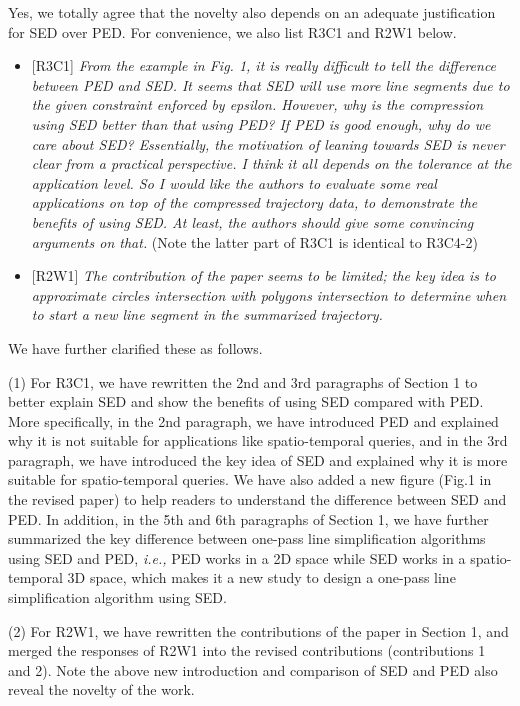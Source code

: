 \documentclass{letter}
\newcommand{\ie}{\emph{i.e.,}\xspace}
\begin{document}
Yes, we totally agree that the novelty also depends on an adequate justification for SED over PED.  For convenience, we also list R3C1 and R2W1 below.

\begin{itemize}
  \item {{[R3C1]} \emph{From the example in Fig. 1, it is really difficult to tell the difference between PED and SED. It seems that SED will use more line segments due to the given constraint enforced by epsilon. However, why is the compression using SED better than that using PED? If PED is good enough, why do we care about SED? Essentially, the motivation of leaning towards SED is never clear from a practical perspective. I think it all depends on the tolerance at the application level. So I would like the authors to evaluate some real applications on top of the compressed trajectory data, to demonstrate the benefits of using SED. At least, the authors should give some convincing arguments on that.} (Note the latter part of R3C1 is identical to R3C4-2)}
  \item {{[R2W1]} \emph{The contribution of the paper seems to be limited; the key idea is to approximate circles intersection with polygons intersection to determine when to start a new line segment in the summarized trajectory.}}
\end{itemize}

We have further clarified these as follows.

(1) For R3C1, we have rewritten the 2nd and 3rd paragraphs of Section 1 to better explain SED and show the benefits of using SED compared with PED.
More specifically, in the 2nd paragraph, we have introduced PED and explained why it is not suitable for applications like spatio-temporal queries, and in the 3rd paragraph, we have introduced the key idea of SED and explained why it is more suitable for spatio-temporal queries.
We have also added a new figure (Fig.1 in the revised paper) to help readers to understand the difference between SED and PED. In addition, in the 5th and 6th paragraphs of Section 1, we have further summarized the key difference between one-pass line simplification algorithms using SED and PED, \ie PED works in a 2D space while SED works in a spatio-temporal 3D space, which makes it a new study to design a one-pass line simplification algorithm using SED.

(2) For R2W1, we have rewritten the contributions of the paper in Section 1, and merged the responses of {R2W1} into the revised contributions (contributions 1 and 2). Note the above new introduction and comparison of SED and PED also reveal the novelty of the work.
\end{document}
